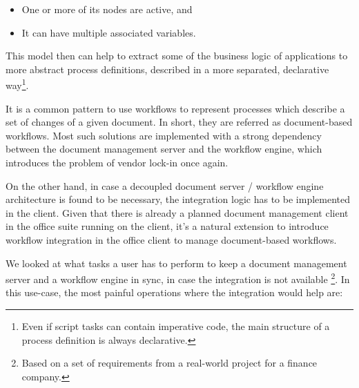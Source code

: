 \begin{itemize}
\item One or more of its nodes are active, and
\item It can have multiple associated variables.
\end{itemize}

This model then can help to extract some of the business logic of applications
to more abstract process definitions, described in a more separated,
declarative way\footnote{Even if script tasks can contain imperative code, the
main structure of a process definition is always declarative.}.

It is a common pattern to use workflows to represent processes which describe a
set of changes of a given document. In short, they are referred as
document-based workflows. Most such solutions are implemented with a strong
dependency between the document management server and the workflow engine,
which introduces the problem of vendor lock-in once again.

On the other hand, in case a decoupled document server / workflow engine
architecture is found to be necessary, the integration logic has to be implemented
in the client. Given that there is already a planned document management client
in the office suite running on the client, it's a natural extension to
introduce workflow integration in the office client to manage document-based
workflows.

We looked at what tasks a user has to perform to keep a document management
server and a workflow engine in sync, in case the integration is not available
\footnote{Based on a set of requirements from a real-world project for a
finance company.}.  In this use-case, the most painful operations where the
integration would help are:


